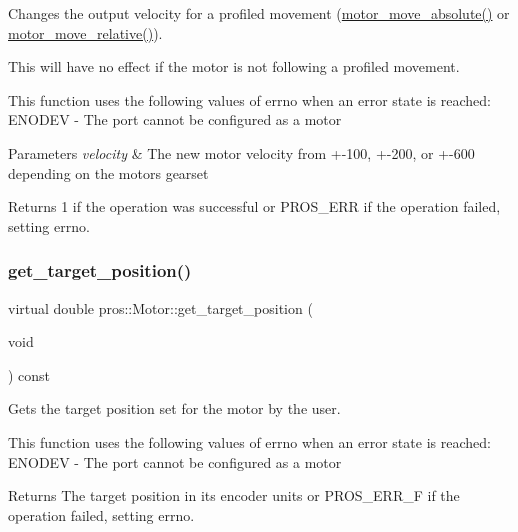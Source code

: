 Changes the output velocity for a profiled movement (\hyperlink{motors_8h_ab70bf4937f1b5cefa15c11c15314c90e}{motor\+\_\+move\+\_\+absolute()} or \hyperlink{motors_8h_ab4c1ba35d69e8e9b49df0e848fa305d3}{motor\+\_\+move\+\_\+relative()}). 

This will have no effect if the motor is not following a profiled movement.

This function uses the following values of errno when an error state is reached\+: E\+N\+O\+D\+EV -\/ The port cannot be configured as a motor


\begin{DoxyParams}{Parameters}
{\em velocity} & The new motor velocity from +-\/100, +-\/200, or +-\/600 depending on the motor\textquotesingle{}s gearset\\
\hline
\end{DoxyParams}
\begin{DoxyReturn}{Returns}
1 if the operation was successful or P\+R\+O\+S\+\_\+\+E\+RR if the operation failed, setting errno. 
\end{DoxyReturn}
\mbox{\label{classpros_1_1Motor_a7ad83a73bf15b94aaad8d10970bb254c}} 
\subsubsection{\texorpdfstring{get\+\_\+target\+\_\+position()}{get\_target\_position()}}
{\footnotesize\ttfamily virtual double pros\+::\+Motor\+::get\+\_\+target\+\_\+position (\begin{DoxyParamCaption}\item[{void}]{ }\end{DoxyParamCaption}) const\hspace{0.3cm}{\ttfamily [virtual]}}



Gets the target position set for the motor by the user. 

This function uses the following values of errno when an error state is reached\+: E\+N\+O\+D\+EV -\/ The port cannot be configured as a motor

\begin{DoxyReturn}{Returns}
The target position in its encoder units or P\+R\+O\+S\+\_\+\+E\+R\+R\+\_\+F if the operation failed, setting errno. 
\end{DoxyReturn}
\mbox{\label{classpros_1_1Motor_a8b8148a179cfadd579c8d4c82eb5873f}} 
